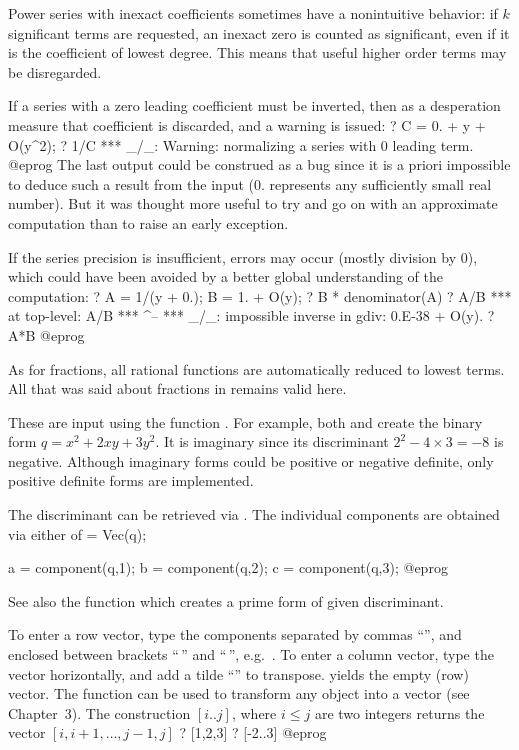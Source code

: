  Power series with inexact coefficients sometimes have a
nonintuitive behavior: if $k$ significant terms are requested, an inexact
zero is counted as significant, even if it is the coefficient of lowest
degree. This means that useful higher order terms may be disregarded.

If a series with a zero leading coefficient must be inverted, then as a
desperation measure that coefficient is discarded, and a warning is issued:
\bprog
? C = 0. + y + O(y^2);
? 1/C
  *** _/_: Warning: normalizing a series with 0 leading term.
@eprog\noindent
The last output could be construed as a bug since it is a priori impossible
to deduce such a result from the input ($0.$ represents any sufficiently
small real number). But it was thought more useful to try and go on with an
approximate computation than to raise an early exception.

If the series precision is insufficient, errors may occur (mostly division
by $0$), which could have been avoided by a better global understanding of
the computation:
\bprog
? A = 1/(y + 0.); B = 1. + O(y);
? B * denominator(A)
? A/B
  ***   at top-level: A/B
  ***                  ^--
  *** _/_: impossible inverse in gdiv: 0.E-38 + O(y).
? A*B
@eprog

%
As for fractions, all rational functions are automatically reduced to lowest
terms. All that was said about fractions in  remains valid
here.

%
These are input using the function . For example, both 
and  create the binary form $q = x^2+2xy+3y^2$. It is
imaginary since its discriminant $2^2 - 4\times 3 = -8$ is negative. Although
imaginary forms could be positive or negative definite, only positive
definite forms are implemented.

The discriminant can be retrieved via . The individual
components are obtained via either of
\bprog
  [a,b,c] = Vec(q);

  a = component(q,1);
  b = component(q,2);
  c = component(q,3);
@eprog

See also the function
 which creates a prime form of given discriminant.

%
To enter a row vector, type the components separated by commas ``\kbd{,}'',
and enclosed between brackets ``\kbd{[}$\,$'' and ``$\,$\kbd{]}'',
e.g.~\kbd{[1,2,3]}. To enter a column vector, type the vector horizontally,
and add a tilde ``\til'' to transpose. \kbd{[ ]} yields the empty (row)
vector. The function  can be used to transform any object into a
vector (see Chapter~3). The construction $[i..j]$, where $i \leq j$ are two
integers returns the vector $[i, i+1,\dots, j-1, j]$
\bprog
? [1,2,3]
? [-2..3]
@eprog

